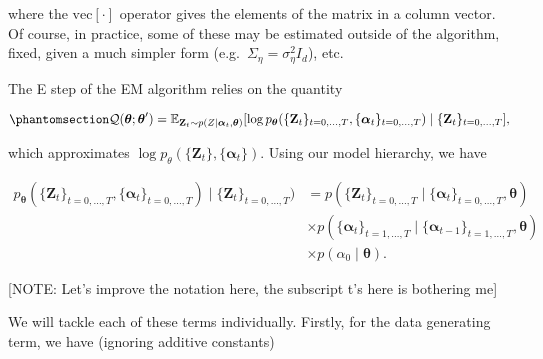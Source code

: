\documentclass[
  letterpaper,
  DIV=11,
  numbers=noendperiod]{scrartcl}
\begin{document}
where the \(\mathrm{vec}[\cdot]\) operator gives the elements of the
matrix in a column vector. Of course, in practice, some of these may be
estimated outside of the algorithm, fixed, given a much simpler form
(e.g.~\(\Sigma_\eta = \sigma_\eta^2 I_d\)), etc.

The E step of the EM algorithm relies on the quantity

\begin{equation}\phantomsection\label{eq-Qdef}{
\begin{split}
\mathcal Q(\boldsymbol{\mathbf{\theta}}; \boldsymbol{\mathbf{\theta}}') = \mathbb E_{\boldsymbol{\mathbf{Z}}_t\sim p(Z \mid \boldsymbol{\mathbf{\alpha}}_t,\boldsymbol{\mathbf{\theta}})}[\log p_{\boldsymbol{\mathbf{\theta}}}(\{\boldsymbol{\mathbf{Z}}_t\}_{t=0,\dots,T}, \{\boldsymbol{\mathbf{\alpha}}_t\}_{t=0,\dots,T})\mid\{\boldsymbol{\mathbf{Z}}_t\}_{t=0,\dots,T}],
\end{split}
}\end{equation}

which approximates
\(\log p_\theta(\{\boldsymbol{\mathbf{Z}}_t\}, \{\boldsymbol{\mathbf{\alpha}}_t\})\).
Using our model hierarchy, we have

\[
\begin{split}
p_{\boldsymbol{\mathbf{\theta}}}(\{\boldsymbol{\mathbf{Z}}_t\}_{t=0,\dots,T}, \{\boldsymbol{\mathbf{\alpha}}_t\}_{t=0,\dots,T})\mid\{\boldsymbol{\mathbf{Z}}_t\}_{t=0,\dots,T}) &= p(\{\boldsymbol{\mathbf{Z}}_t\}_{t=0,\dots,T}\mid \{\boldsymbol{\mathbf{\alpha}}_t\}_{t=0,\dots,T}, \boldsymbol{\mathbf{\theta}})\\
&\times p(\{\boldsymbol{\mathbf{\alpha}}_t\}_{t=1,\dots,T} \mid \{\boldsymbol{\mathbf{\alpha}}_{t-1}\}_{t=1,\dots,T}, \boldsymbol{\mathbf{\theta}})\\
&\times p(\alpha_0\mid \boldsymbol{\mathbf{\theta}}).
\end{split}
\]

{{[}NOTE: Let's improve the notation here, the subscript t's here is
bothering me{]}}

We will tackle each of these terms individually. Firstly, for the data
generating term, we have (ignoring additive constants)
\end{document}
